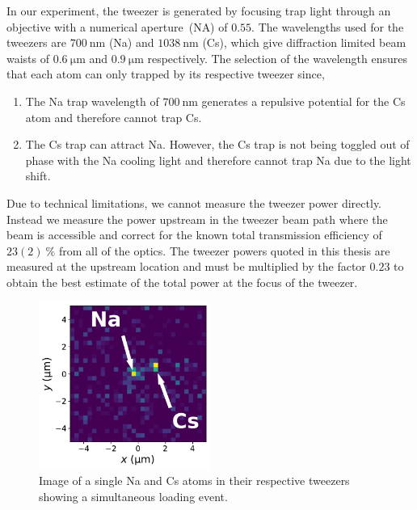 In our experiment, the tweezer is generated by focusing trap light
through an objective with a numerical aperture~(NA) of $0.55$.
The wavelengths used for the tweezers are $700~\mathrm{nm}$ (Na) and $1038~\mathrm{nm}$ (Cs),
which give diffraction limited beam waists of
$0.6~\mathrm{\mu m}$ and $0.9~\mathrm{\mu m}$ respectively.
The selection of the wavelength ensures that each atom can only trapped
by its respective tweezer since,
\begin{enumerate}
\item The Na trap wavelength of $700~\mathrm{nm}$ generates a repulsive potential
  for the Cs atom and therefore cannot trap Cs.
\item The Cs trap can attract Na. However, the Cs trap is not being toggled
  out of phase with the Na cooling light and therefore cannot trap Na due to the light shift.
\end{enumerate}
Due to technical limitations, we cannot measure the tweezer power directly.
Instead we measure the power upstream in the tweezer beam path where the beam is accessible
and correct for the known total transmission efficiency of $23(2)~\mathrm{\%}$
from all of the optics.
The tweezer powers quoted in this thesis are measured at the upstream location
and must be multiplied by the factor $0.23$ to obtain
the best estimate of the total power at the focus of the tweezer.

\begin{figure}
  \centering
  \includegraphics[width=0.5\textwidth]{figures/loading_single_atoms.pdf}
  \caption[Image of single Na and Cs atoms]{
    Image of a single Na and Cs atoms in their respective tweezers
    showing a simultaneous loading event.
    \label{fig:loading:loading:single-atoms}}
\end{figure}

